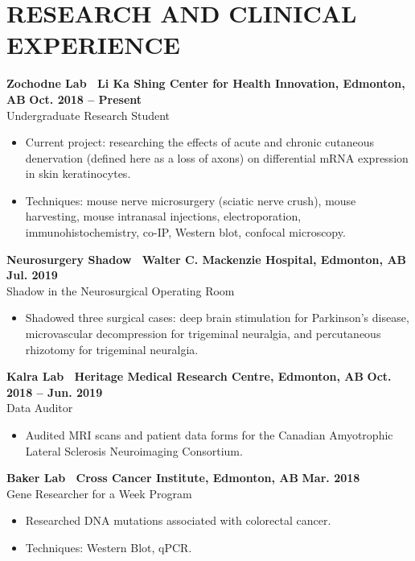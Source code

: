 \documentclass{article}
\begin{document}
\section*{\textcolor{my_colour}{RESEARCH AND CLINICAL EXPERIENCE}}
\vspace{-.25em} \hrulefill \vspace{.75em}

    \textbf{Zochodne Lab \textbar\ Li Ka Shing Center for Health Innovation, Edmonton, AB} \hfill \textbf{Oct. 2018 -- Present}\\
    Undergraduate Research Student
    \begin{itemize}
        \item Current project: researching the effects of acute and chronic cutaneous denervation (defined here as a loss of axons) on differential mRNA expression in skin keratinocytes.
        \item Techniques: mouse nerve microsurgery (sciatic nerve crush), mouse harvesting, mouse intranasal injections, electroporation, immunohistochemistry, co-IP, Western blot, confocal microscopy.
    \end{itemize}

    \textbf{Neurosurgery Shadow \textbar\ Walter C. Mackenzie Hospital, Edmonton, AB} \hfill \textbf{Jul. 2019}\\
    Shadow in the Neurosurgical Operating Room
    \begin{itemize}
        \item Shadowed three surgical cases: deep brain stimulation for Parkinson's disease, microvascular decompression for trigeminal neuralgia, and percutaneous rhizotomy for trigeminal neuralgia.
    \end{itemize}

    \textbf{Kalra Lab \textbar\ Heritage Medical Research Centre, Edmonton, AB} \hfill  \textbf{Oct. 2018 -- Jun. 2019}\\
    Data Auditor
    \begin{itemize}
        \item Audited MRI scans and patient data forms for the Canadian Amyotrophic Lateral Sclerosis Neuroimaging Consortium.
    \end{itemize}

    \textbf{Baker Lab \textbar\ Cross Cancer Institute, Edmonton, AB} \hfill \textbf{Mar. 2018}\\
    Gene Researcher for a Week Program
    \begin{itemize}
        \item Researched DNA mutations associated with colorectal cancer.
        \item Techniques: Western Blot, qPCR.
    \end{itemize}
\end{document}
